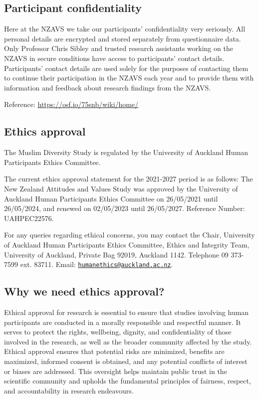 \documentclass[
]{interact}
\begin{document}
\subsection{Participant
confidentiality}\label{participant-confidentiality}

\noindent Here at the NZAVS we take our participants' confidentiality
very seriously. All personal details are encrypted and stored separately
from questionnaire data. Only Professor Chris Sibley and trusted
research assistants working on the NZAVS in secure conditions have
access to participants' contact details. Participants' contact details
are used solely for the purposes of contacting them to continue their
participation in the NZAVS each year and to provide them with
information and feedback about research findings from the NZAVS.

\noindent Reference: \url{https://osf.io/75snb/wiki/home/}

\subsection{Ethics approval}\label{ethics-approval}

\noindent The Muslim Diversity Study is regulated by the University of
Auckland Human Participants Ethics Committee.

\noindent The current ethics approval statement for the 2021-2027 period
is as follows: The New Zealand Attitudes and Values Study was approved
by the University of Auckland Human Participants Ethics Committee on
26/05/2021 until 26/05/2024, and renewed on 02/05/2023 until 26/05/2027.
Reference Number: UAHPEC22576.

\noindent For any queries regarding ethical concerns, you may contact
the Chair, University of Auckland Human Participants Ethics Committee,
Ethics and Integrity Team, University of Auckland, Private Bag 92019,
Auckland 1142. Telephone 09 373-7599 ext. 83711. Email:
\href{mailto:humanethics@auckland.ac.nz}{\nolinkurl{humanethics@auckland.ac.nz}}.

\subsection{Why we need ethics
approval?}\label{why-we-need-ethics-approval}

\noindent Ethical approval for research is essential to ensure that
studies involving human participants are conducted in a morally
responsible and respectful manner. It serves to protect the rights,
wellbeing, dignity, and confidentiality of those involved in the
research, as well as the broader community affected by the study.
Ethical approval ensures that potential risks are minimized, benefits
are maximized, informed consent is obtained, and any potential conflicts
of interest or biases are addressed. This oversight helps maintain
public trust in the scientific community and upholds the fundamental
principles of fairness, respect, and accountability in research
endeavours.
\end{document}
